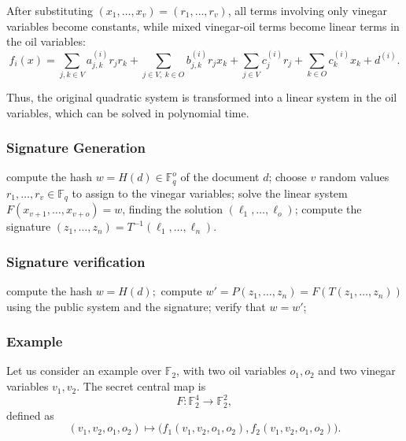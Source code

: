 \noindent
After substituting \((x_1,\dots,x_v)=(r_1,\dots,r_v)\), all terms involving only vinegar variables become constants, while mixed vinegar-oil terms become linear terms in the oil variables:
\[
f_i(x)=
\sum_{j,k\in V} a_{j,k}^{(i)}r_jr_k
+
\sum_{j\in V,\ k\in O} b_{j,k}^{(i)}r_jx_k
+
\sum_{j\in V} c_j^{(i)}r_j
+
\sum_{k\in O} c_k^{(i)}x_k
+
d^{(i)}.
\]

\noindent
Thus, the original quadratic system is transformed into a linear system in the oil variables, which can be solved in polynomial time.
\newpage

\subsubsection{Signature Generation}
\begin{algorithm}
\begin{algorithmic}[1]
    \State compute the hash $w = H(d) \in \mathbb{F}_q^o$ of the document $d$;
    \State choose $v$ random values $r_1,\dots,r_v \in \mathbb{F}_q$ to assign to the vinegar variables;
    \State solve the linear system $F(x_{v+1},\dots,x_{v+o}) = w$, finding the solution $(\ell_1,\dots,\ell_o)$;
    \State compute the signature $(z_1,\dots,z_n) = T^{-1}(\ell_1,\dots,\ell_n)$.
\end{algorithmic}
\end{algorithm}

\subsubsection{Signature verification}
\begin{algorithm}
\begin{algorithmic}[1]
    \State compute the hash $w = H(d);$
    \State compute $w' = P(z_1,\dots,z_n) = F(T(z_1,\dots,z_n))$ using the public system and the signature;
    \State verify that $w = w'$;
\end{algorithmic}
\end{algorithm}

\subsubsection{Example}

Let us consider an example over \(\mathbb F_2\), with two oil variables
\(o_1,o_2\) and two vinegar variables \(v_1,v_2\). The secret central map is
\[
F:\mathbb F_2^4 \to \mathbb F_2^2,
\]
defined as
\[
(v_1,v_2,o_1,o_2)
\mapsto
\bigl(
f_1(v_1,v_2,o_1,o_2),
f_2(v_1,v_2,o_1,o_2)
\bigr).
\]

